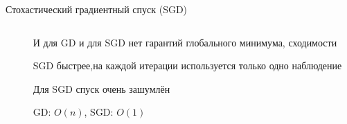\documentclass[notes,12pt, aspectratio=169]{beamer}
\newenvironment{wideitemize}{\itemize\addtolength{\itemsep}{10pt}}{\enditemize}
\begin{document}
\begin{frame}{Стохастический градиентный спуск (SGD)}
\begin{columns}[T] %
	\begin{column}{.5\textwidth}
	\end{column}%
	\hfill%
	\begin{column}{.5\textwidth}
		\begin{wideitemize}
			\item И для GD и для SGD нет гарантий глобального минимума, сходимости
			\item SGD быстрее,на каждой итерации используется только одно наблюдение
			\item Для SGD спуск очень зашумлён 
			\item  GD: $O(n)$, SGD: $O(1)$
		\end{wideitemize}
	\end{column}%
\end{columns}
\end{frame}
\end{document}
